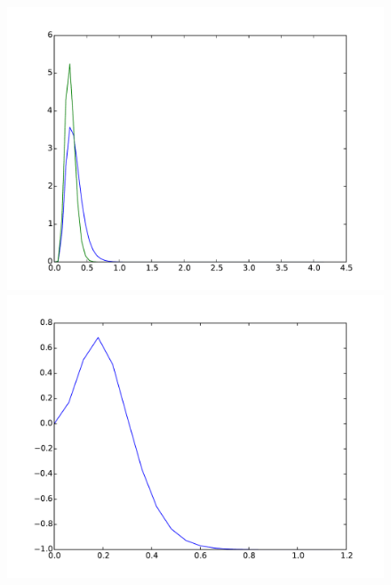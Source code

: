 \documentclass{article}
\begin{document}
\begin{figure}[htb]
	\centering
	\begin{minipage}{.3\textwidth}
		\centering
		\includegraphics[width=0.97\linewidth]{bootstrap-filter/global_simple_1_3.pdf}
	\end{minipage}
	\begin{minipage}{.3\textwidth}
		\centering
		\includegraphics[width=0.97\linewidth]{bootstrap-filter/relative_beginning_simple_1_3.pdf}
	\end{minipage}
	\begin{minipage}{.3\textwidth}
		\centering

\end{minipage}
\end{figure}
\end{document}
